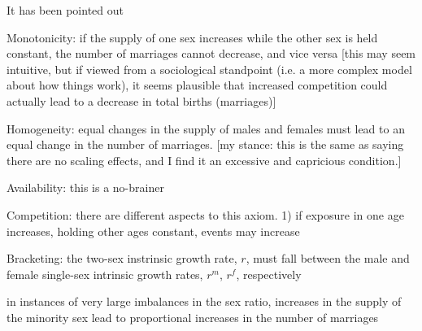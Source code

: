  \FloatBarrier
It has been pointed out


Monotonicity: if the supply of one sex increases while the other sex is held
constant, the number of marriages cannot decrease, and vice versa [this may
seem intuitive, but if viewed from a sociological standpoint (i.e. a more
complex model about how things work), it seems plausible that increased
competition could actually lead to a decrease in total births (marriages)]

Homogeneity: equal changes in the supply of males and females must lead to an
equal change in the number of marriages. [my stance: this is the same as saying
there are no scaling effects, and I find it an excessive and
capricious condition.]

Availability: this is a no-brainer

Competition: there are different aspects to this axiom. 1) if exposure in one
age increases, holding other ages constant, events may increase

Bracketing: the two-sex instrinsic growth rate, $r$, must fall between the male
and female single-sex intrinsic growth rates, $r^m$, $r^f$, respectively

in instances of very large imbalances in the sex ratio, increases in the supply
of the minority sex lead to proportional increases in the number of marriages
